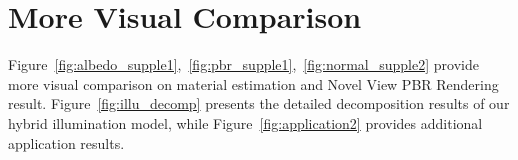\section{More Visual Comparison}
Figure~\ref{fig:albedo_supple1},~\ref{fig:pbr_supple1},~\ref{fig:normal_supple2} provide more visual comparison on material estimation and Novel View PBR Rendering result. Figure~\ref{fig:illu_decomp} presents the detailed decomposition results of our hybrid illumination model, while  Figure~\ref{fig:application2} provides additional application results.



